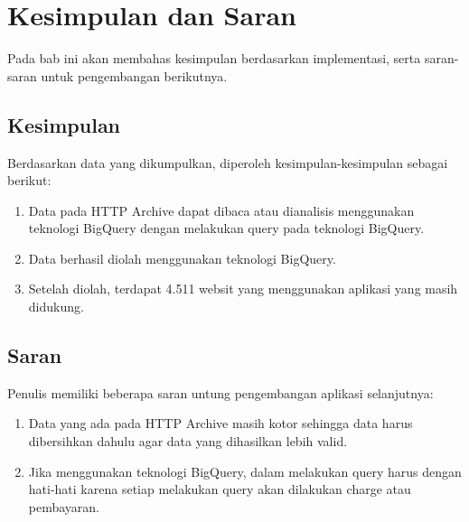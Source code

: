 \chapter{Kesimpulan dan Saran}
\label{chap:kesimpulan_dan_saran}

Pada bab ini akan membahas kesimpulan berdasarkan implementasi, serta saran-saran untuk pengembangan berikutnya.

\section{Kesimpulan}
Berdasarkan data yang dikumpulkan, diperoleh kesimpulan-kesimpulan sebagai berikut:
\begin{enumerate}
	\item Data pada HTTP Archive dapat dibaca atau dianalisis menggunakan teknologi BigQuery dengan melakukan query pada teknologi BigQuery.
	\item Data berhasil diolah menggunakan teknologi BigQuery.
	\item Setelah diolah, terdapat 4.511 websit yang menggunakan aplikasi yang masih didukung.
\end{enumerate}

\section{Saran}
Penulis memiliki beberapa saran untung pengembangan aplikasi selanjutnya:
\begin{enumerate}
	\item Data yang ada pada HTTP Archive masih kotor sehingga data harus dibersihkan dahulu agar data yang dihasilkan lebih valid.
	\item Jika menggunakan teknologi BigQuery, dalam melakukan query harus dengan hati-hati karena setiap melakukan query akan dilakukan charge atau pembayaran.
\end{enumerate}